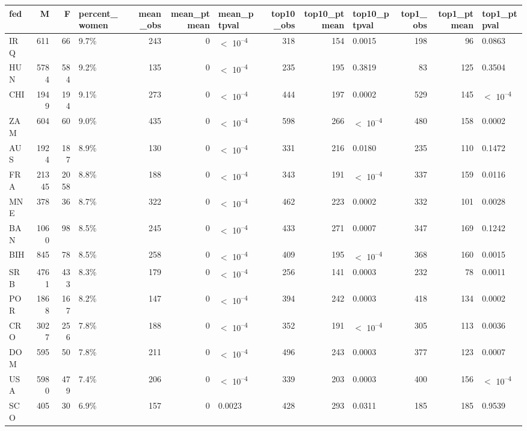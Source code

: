 
\begin{tabular}[t]{lrrlrrlrrlrrl}
\toprule
fed & M & F & percent_women & mean_obs & mean_ptmean & mean_ptpval & top10_obs & top10_ptmean & top10_ptpval & top1_obs & top1_ptmean & top1_ptpval\\
\midrule
IRQ & 611 & 66 & 9.7\% & 243 & 0 & $<$ 10\textsuperscript{--4} & 318 & 154 & 0.0015 & 198 & 96 & 0.0863\\
HUN & 5784 & 584 & 9.2\% & 135 & 0 & $<$ 10\textsuperscript{--4} & 235 & 195 & 0.3819 & 83 & 125 & 0.3504\\
CHI & 1949 & 194 & 9.1\% & 273 & 0 & $<$ 10\textsuperscript{--4} & 444 & 197 & 0.0002 & 529 & 145 & $<$ 10\textsuperscript{--4}\\
ZAM & 604 & 60 & 9.0\% & 435 & 0 & $<$ 10\textsuperscript{--4} & 598 & 266 & $<$ 10\textsuperscript{--4} & 480 & 158 & 0.0002\\
AUS & 1924 & 187 & 8.9\% & 130 & 0 & $<$ 10\textsuperscript{--4} & 331 & 216 & 0.0180 & 235 & 110 & 0.1472\\
FRA & 21345 & 2058 & 8.8\% & 188 & 0 & $<$ 10\textsuperscript{--4} & 343 & 191 & $<$ 10\textsuperscript{--4} & 337 & 159 & 0.0116\\
MNE & 378 & 36 & 8.7\% & 322 & 0 & $<$ 10\textsuperscript{--4} & 462 & 223 & 0.0002 & 332 & 101 & 0.0028\\
BAN & 1060 & 98 & 8.5\% & 245 & 0 & $<$ 10\textsuperscript{--4} & 433 & 271 & 0.0007 & 347 & 169 & 0.1242\\
BIH & 845 & 78 & 8.5\% & 258 & 0 & $<$ 10\textsuperscript{--4} & 409 & 195 & $<$ 10\textsuperscript{--4} & 368 & 160 & 0.0015\\
SRB & 4761 & 433 & 8.3\% & 179 & 0 & $<$ 10\textsuperscript{--4} & 256 & 141 & 0.0003 & 232 & 78 & 0.0011\\
POR & 1868 & 167 & 8.2\% & 147 & 0 & $<$ 10\textsuperscript{--4} & 394 & 242 & 0.0003 & 418 & 134 & 0.0002\\
CRO & 3027 & 256 & 7.8\% & 188 & 0 & $<$ 10\textsuperscript{--4} & 352 & 191 & $<$ 10\textsuperscript{--4} & 305 & 113 & 0.0036\\
DOM & 595 & 50 & 7.8\% & 211 & 0 & $<$ 10\textsuperscript{--4} & 496 & 243 & 0.0003 & 377 & 123 & 0.0007\\
USA & 5980 & 479 & 7.4\% & 206 & 0 & $<$ 10\textsuperscript{--4} & 339 & 203 & 0.0003 & 400 & 156 & $<$ 10\textsuperscript{--4}\\
SCO & 405 & 30 & 6.9\% & 157 & 0 & 0.0023 & 428 & 293 & 0.0311 & 185 & 185 & 0.9539\\

\end{tabular}
